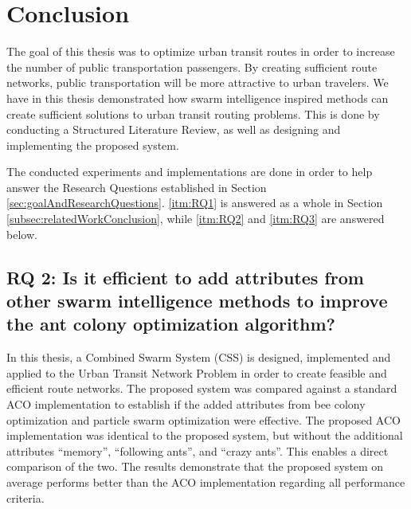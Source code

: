 \section{Conclusion}
\label{sec:conclusion}

The goal of this thesis was to optimize urban transit routes in order to increase the number of public transportation passengers. By creating sufficient route networks, public transportation will be more attractive to urban travelers. We have in this thesis demonstrated how swarm intelligence inspired methods can create sufficient solutions to urban transit routing problems. This is done by conducting a Structured Literature Review\citep{kofod2014}, as well as designing and implementing the proposed system. 

The conducted experiments and implementations are done in order to help answer the Research Questions established in Section \vref{sec:goalAndResearchQuestions}. \ref{itm:RQ1} is answered as a whole in Section \vref{subsec:relatedWorkConclusion}, while \ref{itm:RQ2} and \ref{itm:RQ3} are answered below. 


\subsection*{RQ 2: Is it efficient to add attributes from other swarm intelligence methods to improve the ant colony optimization algorithm?}

In this thesis, a Combined Swarm System (CSS) is designed, implemented and applied to the Urban Transit Network Problem in order to create feasible and efficient route networks. The proposed system was compared against a standard ACO implementation to establish if the added attributes from bee colony optimization and particle swarm optimization were effective. The proposed ACO implementation was identical to the proposed system, but without the additional attributes ``memory'', ``following ants'', and ``crazy ants''. This enables a direct comparison of the two. The results demonstrate that the proposed system on average performs better than the ACO implementation regarding all performance criteria.


